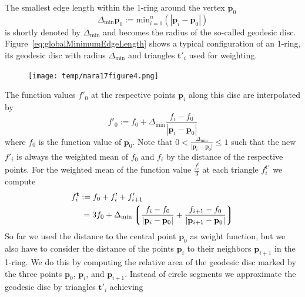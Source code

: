 \documentclass[openany]{book}
\begin{document}
The smallest edge length within the 1-ring around the vertex $\mathbf{p}_0$ 
\begin{equation}
	\Delta_\text{min}\mathbf{p}_0 := \text{min}^n_{i=1} (|\mathbf{p}_i - \mathbf{p}_0|)
	\label{eq:globalMinimumEdgeLength}
\end{equation}
is shortly denoted by $\Delta_\text{min}$ and becomes the radius of the
so-called geodesic disc. Figure~\ref{eq:globalMinimumEdgeLength} shows 
a typical configuration of an 1-ring, its geodesic disc with radius 
$\Delta_\text{min}$ and triangles $\mathbf{t}'_i$ used for weighting.
\begin{figure}
	\texttt{[image: temp/mara17figure4.png]}	
\end{figure}
The function values $f'_0$ at the respective points $\mathbf{p}_i$ along 
this disc are interpolated by 
\begin{equation}
	f'_0 := f_0 + \Delta_\text{min}\frac{f_i - f_0}{|\mathbf{p}_i - \mathbf{p}_0|} 
\end{equation}
where $f_0$ is the function value of $\mathbf{p}_0$. Note that $0 < \frac{
\Delta_\text{min}}{|\mathbf{p}_i - \mathbf{p}_0|} \leq 1$ such that the new 
$f'_i$ is always the weighted mean of $f_0$ and $f_i$ by the distance of the
respective points. For the weighted mean of the function value $\frac{f_i^t}{3}$ at 
each triangle $f^{\mathbf{t}'}_i$ we compute
\begin{align}
	f^{\mathbf{t}}_i & := f_0 + f'_i + f'_{i+1} \\
	& \: = 3f_0 + \Delta_\text{min}\left\lgroup\frac{f_i - f_0}{|\mathbf{p}_i - \mathbf{p}_0|} + 
	\frac{f_{i+1} - f_0}{|\mathbf{p}_{i+1} - \mathbf{p}_0|}\right\rgroup
\end{align}
So far we used the distance to the central point $\mathbf{p}_0$ as weight 
function, but we also have to consider the distance of the points 
$\mathbf{p}_i$ to their neighbors $\mathbf{p}_{i+1}$ in the 1-ring. We do this 
by computing the relative area of the geodesic disc marked by the three points 
$\mathbf{p}_0$, $\mathbf{p}_i$, and $\mathbf{p}_{i+1}$. Instead of circle 
segments we approximate the geodesic disc by triangles $\mathbf{t}'_i$ achieving 
\end{document}
